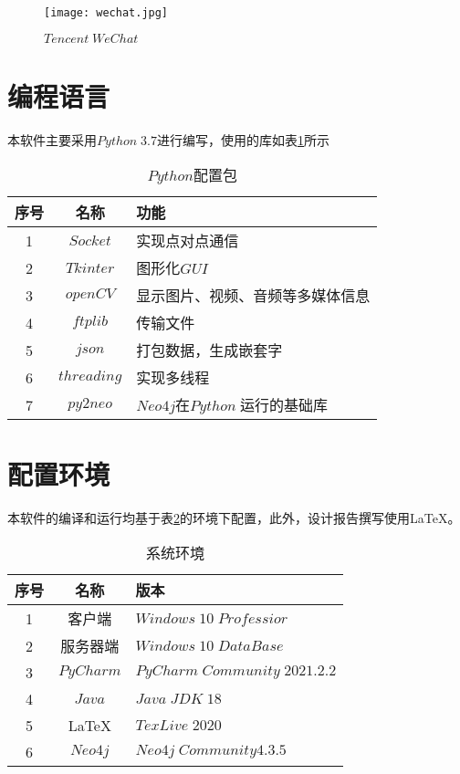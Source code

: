 \documentclass[forprint]{OSPaper}
\begin{document}
\begin{figure}[ht]
	\centering
	\texttt{[image: wechat.jpg]}
	\caption{$Tencent \; WeChat $}
	\label{fig:3}
\end{figure}
\section{编程语言}

本软件主要采用$Python \; 3.7$进行编写，使用的库如表\ref{table:1}所示
\begin{table}[ht]\centering
	\caption{$Python$配置包}
	\label{table:1}
	\begin{tabular}{ccl}
		\hline
		序号 & 名称       & 功能                           \\ \hline
		1  & $Socket$    & 实现点对点通信                   \\
		2  & $Tkinter$   & 图形化$GUI$                      \\
		3  & $openCV$    & 显示图片、视频、音频等多媒体信息    \\
		4  & $ftplib$    & 传输文件                           \\
		5  & $json$      & 打包数据，生成嵌套字                \\
		6  & $threading$ & 实现多线程                          \\
		7  & $py2neo$    & $Neo4j$在$Python \;$运行的基础库     \\ \hline
	\end{tabular}
\end{table}

\section{配置环境}

本软件的编译和运行均基于表\ref{table:2}的环境下配置，此外，设计报告撰写使用\LaTeX{}。

\begin{table}[ht]\centering
	\caption{系统环境}
	\label{table:2}
	\begin{tabular}{ccl}
		\hline
		序号 & 名称        & 版本                                                        \\ \hline
		1  & 客户端       & $Windows \;10 \; Professior$                              \\
		2  & 服务器端      & $Windows \; 10 \; DataBase $\\
		3  & $PyCharm$ & $PyCharm \; Community \; 2021.2.2$                        \\
		4  & $Java$    & $Java \; JDK \; 18$                                       \\
		5  & \LaTeX{}   & $TexLive \; 2020$                                      \\
		6  & $Neo4j$   & $Neo4j \; Community 4.3.5$                                \\ \hline
	\end{tabular}
\end{table}
\end{document}

